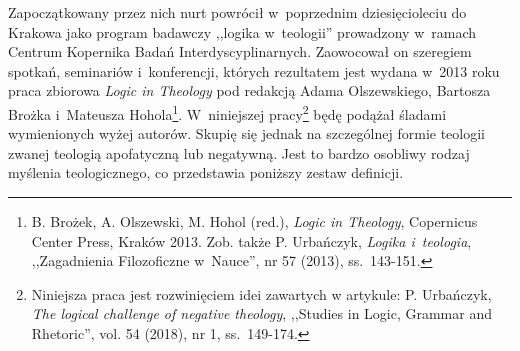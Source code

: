 Zapoczątkowany przez nich nurt powrócił w~poprzednim dziesięcioleciu do Krakowa jako program badawczy ,,logika w~teologii'' prowadzony w~ramach Centrum Kopernika Badań Interdyscyplinarnych. Zaowocował on szeregiem spotkań, seminariów i~konferencji, których rezultatem jest wydana w~2013 roku praca zbiorowa \textit{Logic in Theology} pod redakcją Adama Olszewskiego, Bartosza Brożka i~Mateusza Hohola\footnote{B. Brożek, A. Olszewski, M. Hohol (red.), \textit{Logic in Theology}, Copernicus Center Press, Kraków 2013. Zob. także P. Urbańczyk, \textit{Logika i~teologia}, ,,Zagadnienia Filozoficzne w~Nauce'', nr 57 (2013), ss.~143-151.}. W~niniejszej pracy\footnote{Niniejsza praca jest
rozwinięciem idei zawartych w artykule: P. Urbańczyk, \textit{The logical challenge of negative theology}, ,,Studies in Logic, Grammar and Rhetoric'', vol. 54 (2018), nr 1, ss.~149-174.} będę podążał śladami wymienionych wyżej autorów. Skupię się jednak na szczególnej formie teologii zwanej teologią apofatyczną lub negatywną. Jest to bardzo osobliwy rodzaj myślenia teologicznego, co przedstawia poniższy zestaw definicji.


